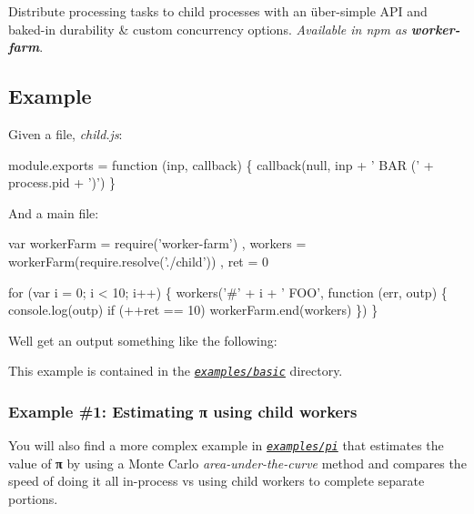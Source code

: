 \href{https://nodei.co/npm/worker-farm/}{\tt } \href{https://nodei.co/npm/worker-farm/}{\tt }

Distribute processing tasks to child processes with an über-\/simple A\+PI and baked-\/in durability \& custom concurrency options. {\itshape Available in npm as {\bfseries worker-\/farm}}.

\subsection*{Example}

Given a file, {\itshape child.\+js}\+:


\begin{DoxyCode}
module.exports = function (inp, callback) \{
  callback(null, inp + ' BAR (' + process.pid + ')')
\}
\end{DoxyCode}


And a main file\+:


\begin{DoxyCode}
var workerFarm = require('worker-farm')
  , workers    = workerFarm(require.resolve('./child'))
  , ret        = 0

for (var i = 0; i < 10; i++) \{
  workers('#' + i + ' FOO', function (err, outp) \{
    console.log(outp)
    if (++ret == 10)
      workerFarm.end(workers)
  \})
\}
\end{DoxyCode}


We\textquotesingle{}ll get an output something like the following\+:




This example is contained in the {\itshape \href{https://github.com/rvagg/node-worker-farm/tree/master/examples/basic/}{\tt examples/basic}} directory.

\subsubsection*{Example \#1\+: Estimating π using child workers}

You will also find a more complex example in {\itshape \href{https://github.com/rvagg/node-worker-farm/tree/master/examples/pi/}{\tt examples/pi}} that estimates the value of {\bfseries π} by using a Monte Carlo {\itshape area-\/under-\/the-\/curve} method and compares the speed of doing it all in-\/process vs using child workers to complete separate portions.


